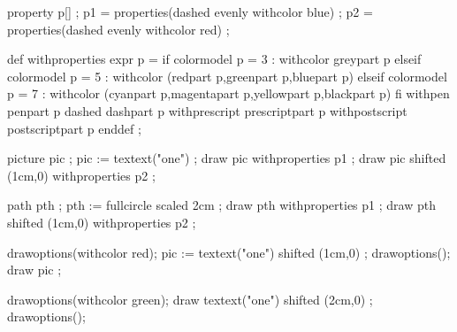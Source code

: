 \startMPpage
    property p[] ;
    p1 = properties(dashed evenly withcolor blue) ;
    p2 = properties(dashed evenly withcolor red) ;


def withproperties expr p =
    if colormodel p = 3 :
        withcolor greypart p
    elseif colormodel p = 5 :
        withcolor (redpart p,greenpart p,bluepart p)
    elseif colormodel p = 7 :
        withcolor (cyanpart p,magentapart p,yellowpart p,blackpart p)
    fi
    withpen penpart p
        dashed dashpart p
    withprescript prescriptpart p
    withpostscript postscriptpart p
enddef ;


    picture pic ;
    pic := textext("one") ;
    draw pic withproperties p1 ;
    draw pic shifted (1cm,0) withproperties p2 ;

    path pth ;
    pth := fullcircle scaled 2cm ;
    draw pth withproperties p1 ;
    draw pth shifted (1cm,0) withproperties p2 ;

    drawoptions(withcolor red);
    pic := textext("one") shifted (1cm,0) ;
    drawoptions();
    draw pic ;

    drawoptions(withcolor green);
    draw textext("one") shifted (2cm,0) ;
    drawoptions();

\stopMPpage
